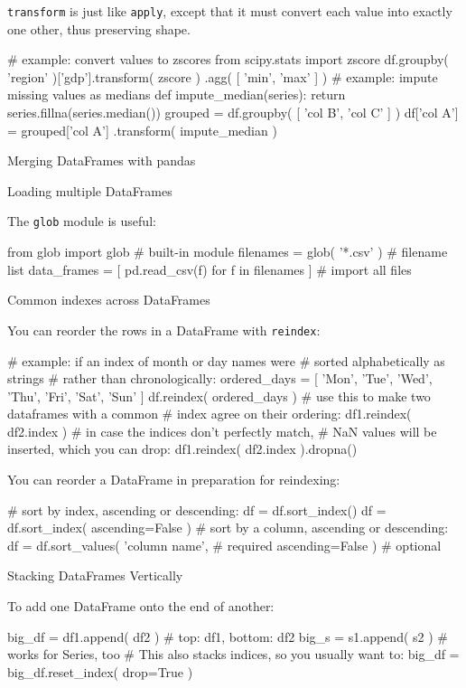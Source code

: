 \documentclass[a4paper,landscape,columns=3]{cheatsheet}
\def\chap#1{\vspace{5mm}\begin{tcolorbox}[colback=red!5!white,colframe=red!75!black,leftrule=3mm]
    \Large #1
\end{tcolorbox}}
\def\sect#1{\begin{tcolorbox}[colback=blue!5!white,colframe=blue!75!black,size=title,leftrule=2mm]
    \large #1
\end{tcolorbox}}
\begin{document}
\lstinline{transform} is just like \lstinline{apply}, except that it must convert each value into exactly one other, thus preserving shape.
\begin{python}
# example: convert values to zscores
from scipy.stats import zscore
df.groupby( 'region' )['gdp'].transform( zscore )
  .agg( [ 'min', 'max' ] )
# example: impute missing values as medians
def impute_median(series):
    return series.fillna(series.median())
grouped = df.groupby( [ 'col B', 'col C' ] )
df['col A'] = grouped['col A']
              .transform( impute_median )
\end{python}

\chap{Merging DataFrames with pandas}

\sect{Loading multiple DataFrames}

The \lstinline{glob} module is useful:
\begin{python}
from glob import glob            # built-in module
filenames = glob( '*.csv' )      # filename list
data_frames = [ pd.read_csv(f)
    for f in filenames ]         # import all files
\end{python}

\sect{Common indexes across DataFrames}

You can reorder the rows in a DataFrame with \lstinline{reindex}:
\begin{python}
# example: if an index of month or day names were
# sorted alphabetically as strings
# rather than chronologically:
ordered_days = [ 'Mon', 'Tue', 'Wed', 'Thu',
                 'Fri', 'Sat', 'Sun' ]
df.reindex( ordered_days )
# use this to make two dataframes with a common
# index agree on their ordering:
df1.reindex( df2.index )
# in case the indices don't perfectly match,
# NaN values will be inserted, which you can drop:
df1.reindex( df2.index ).dropna()
\end{python}

You can reorder a DataFrame in preparation for reindexing:
\begin{python}
# sort by index, ascending or descending:
df = df.sort_index()
df = df.sort_index( ascending=False )
# sort by a column, ascending or descending:
df = df.sort_values( 'column name',      # required
                     ascending=False )   # optional
\end{python}

\sect{Stacking DataFrames Vertically}

To add one DataFrame onto the end of another:
\begin{python}
big_df = df1.append( df2 )  # top: df1, bottom: df2
big_s = s1.append( s2 )     # works for Series, too
# This also stacks indices, so you usually want to:
big_df = big_df.reset_index( drop=True )
\end{python}
\end{document}

